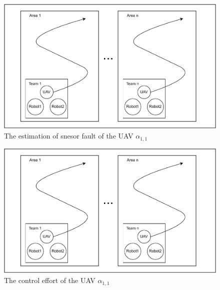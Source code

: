 \documentclass{ieeeaccess}
\begin{document}
\begin{figure}[htbp]
    \centering
    \includegraphics[scale=.42]{fig/1.pdf}\caption{The estimation of snesor fault of the UAV $\alpha_{1,1}$}%
    \label{fig:UAV, fs}
\end{figure}
\begin{figure}[htbp]
    \centering
    \includegraphics[scale=.42]{fig/1.pdf}\caption{The control effort of the UAV $\alpha_{1,1}$}%
    \label{fig:UAV, control}
\end{figure}
\end{document}
